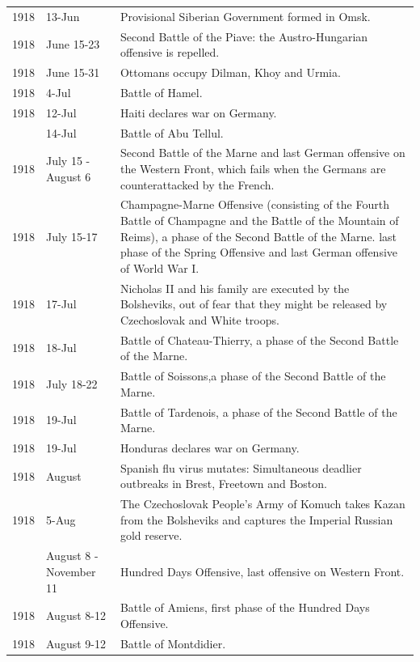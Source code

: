 \documentclass[
  openany]{book}
\begin{document}
\begin{longtable}[t]{rl>{\raggedright\arraybackslash}p{22em}}
\addlinespace
\rowcolor{gray!6}  1918 & 13-Jun & Provisional Siberian Government formed in Omsk.\\
1918 & June 15-23 & Second Battle of the Piave: the Austro-Hungarian offensive is repelled.\\
\rowcolor{gray!6}  1918 & June 15-31 & Ottomans occupy Dilman, Khoy and Urmia.\\
1918 & 4-Jul & Battle of Hamel.\\
\rowcolor{gray!6}  1918 & 12-Jul & Haiti declares war on Germany.\\
\addlinespace
1918 & 14-Jul & Battle of Abu Tellul.\\
\rowcolor{gray!6}  1918 & July 15 - August 6 & Second Battle of the Marne and last German offensive on the Western Front, which fails when the Germans are counterattacked by the French.\\
1918 & July 15-17 & Champagne-Marne Offensive (consisting of the Fourth Battle of Champagne and the Battle of the Mountain of Reims), a phase of the Second Battle of the Marne. last phase of the Spring Offensive and last German offensive of World War I.\\
\rowcolor{gray!6}  1918 & 17-Jul & Nicholas II and his family are executed by the Bolsheviks, out of fear that they might be released by Czechoslovak and White troops.\\
1918 & 18-Jul & Battle of Chateau-Thierry, a phase of the Second Battle of the Marne.\\
\addlinespace
\rowcolor{gray!6}  1918 & July 18-22 & Battle of Soissons,a phase of the Second Battle of the Marne.\\
1918 & 19-Jul & Battle of Tardenois, a phase of the Second Battle of the Marne.\\
\rowcolor{gray!6}  1918 & 19-Jul & Honduras declares war on Germany.\\
1918 & August & Spanish flu virus mutates: Simultaneous deadlier outbreaks in Brest, Freetown and Boston.\\
\rowcolor{gray!6}  1918 & 5-Aug & The Czechoslovak People's Army of Komuch takes Kazan from the Bolsheviks and captures the Imperial Russian gold reserve.\\
\addlinespace
1918 & August 8 - November 11 & Hundred Days Offensive, last offensive on Western Front.\\
\rowcolor{gray!6}  1918 & August 8-12 & Battle of Amiens, first phase of the Hundred Days Offensive.\\
1918 & August 9-12 & Battle of Montdidier.\\

\end{longtable}
\end{document}
